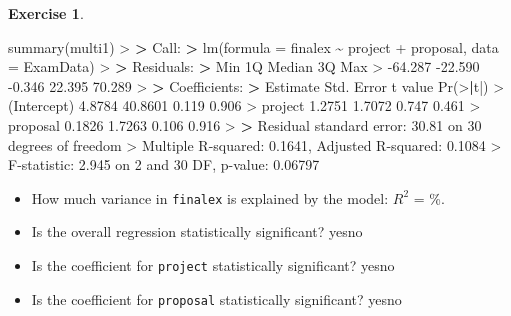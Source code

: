 \documentclass[
]{book}
\newenvironment{Shaded}{\begin{snugshade}}{\end{snugshade}}
\newcommand{\AttributeTok}[1]{\textcolor[rgb]{0.77,0.63,0.00}{#1}}
\newcommand{\DecValTok}[1]{\textcolor[rgb]{0.00,0.00,0.81}{#1}}
\newcommand{\ErrorTok}[1]{\textcolor[rgb]{0.64,0.00,0.00}{\textbf{#1}}}
\newcommand{\FloatTok}[1]{\textcolor[rgb]{0.00,0.00,0.81}{#1}}
\newcommand{\FunctionTok}[1]{\textcolor[rgb]{0.00,0.00,0.00}{#1}}
\newcommand{\NormalTok}[1]{#1}
\newcommand{\SpecialCharTok}[1]{\textcolor[rgb]{0.00,0.00,0.00}{#1}}
\theoremstyle{definition}
\theoremstyle{definition}
\theoremstyle{definition}
\newtheorem{exercise}{Exercise}[chapter]
\theoremstyle{definition}
\theoremstyle{remark}
\begin{document}
\begin{exercise}
\begin{Shaded}
\begin{Highlighting}[]
\FunctionTok{summary}\NormalTok{(multi1)}
\SpecialCharTok{\textgreater{}} 
\ErrorTok{\textgreater{}}\NormalTok{ Call}\SpecialCharTok{:}
\ErrorTok{\textgreater{}} \FunctionTok{lm}\NormalTok{(}\AttributeTok{formula =}\NormalTok{ finalex }\SpecialCharTok{\textasciitilde{}}\NormalTok{ project }\SpecialCharTok{+}\NormalTok{ proposal, }\AttributeTok{data =}\NormalTok{ ExamData)}
\SpecialCharTok{\textgreater{}} 
\ErrorTok{\textgreater{}}\NormalTok{ Residuals}\SpecialCharTok{:}
\ErrorTok{\textgreater{}}\NormalTok{     Min      1Q  Median      3Q     Max }
\SpecialCharTok{\textgreater{}} \SpecialCharTok{{-}}\FloatTok{64.287} \SpecialCharTok{{-}}\FloatTok{22.590}  \SpecialCharTok{{-}}\FloatTok{0.346}  \FloatTok{22.395}  \FloatTok{70.289} 
\SpecialCharTok{\textgreater{}} 
\ErrorTok{\textgreater{}}\NormalTok{ Coefficients}\SpecialCharTok{:}
\ErrorTok{\textgreater{}}\NormalTok{             Estimate Std. Error t value }\FunctionTok{Pr}\NormalTok{(}\SpecialCharTok{\textgreater{}}\ErrorTok{|}\NormalTok{t}\SpecialCharTok{|}\NormalTok{)}
\SpecialCharTok{\textgreater{}}\NormalTok{ (Intercept)   }\FloatTok{4.8784}    \FloatTok{40.8601}   \FloatTok{0.119}    \FloatTok{0.906}
\SpecialCharTok{\textgreater{}}\NormalTok{ project       }\FloatTok{1.2751}     \FloatTok{1.7072}   \FloatTok{0.747}    \FloatTok{0.461}
\SpecialCharTok{\textgreater{}}\NormalTok{ proposal      }\FloatTok{0.1826}     \FloatTok{1.7263}   \FloatTok{0.106}    \FloatTok{0.916}
\SpecialCharTok{\textgreater{}} 
\ErrorTok{\textgreater{}}\NormalTok{ Residual standard error}\SpecialCharTok{:} \FloatTok{30.81}\NormalTok{ on }\DecValTok{30}\NormalTok{ degrees of freedom}
\SpecialCharTok{\textgreater{}}\NormalTok{ Multiple R}\SpecialCharTok{{-}}\NormalTok{squared}\SpecialCharTok{:}  \FloatTok{0.1641}\NormalTok{,  Adjusted R}\SpecialCharTok{{-}}\NormalTok{squared}\SpecialCharTok{:}  \FloatTok{0.1084} 
\SpecialCharTok{\textgreater{}}\NormalTok{ F}\SpecialCharTok{{-}}\NormalTok{statistic}\SpecialCharTok{:} \FloatTok{2.945}\NormalTok{ on }\DecValTok{2}\NormalTok{ and }\DecValTok{30}\NormalTok{ DF,  p}\SpecialCharTok{{-}}\NormalTok{value}\SpecialCharTok{:} \FloatTok{0.06797}
\end{Highlighting}
\end{Shaded}

\begin{itemize}
\item
  How much variance in \texttt{finalex} is explained by the model: \(R^2\) = \%.
\item
  Is the overall regression statistically significant? yesno
\item
  Is the coefficient for \texttt{project} statistically significant? yesno
\item
  Is the coefficient for \texttt{proposal} statistically significant? yesno
\end{itemize}

\end{exercise}
\end{document}
